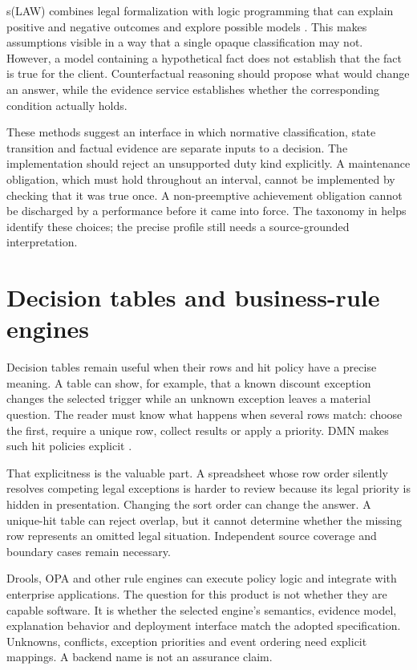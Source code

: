 \documentclass[12pt,a4paper,oneside,openany]{book}
\begin{document}
s(LAW) combines legal formalization with logic programming that can explain
positive and negative outcomes and explore possible models
\citep[secs.~2--5]{slaw2024}. This makes assumptions visible in a way that a
single opaque classification may not. However, a model containing a hypothetical
fact does not establish that the fact is true for the client. Counterfactual
reasoning should propose what would change an answer, while the evidence
service establishes whether the corresponding condition actually holds.

These methods suggest an interface in which normative classification,
state transition and factual evidence are separate inputs to a decision. The
implementation should reject an unsupported duty kind explicitly. A maintenance
obligation, which must hold throughout an interval, cannot be implemented by
checking that it was true once. A non-preemptive achievement obligation cannot
be discharged by a performance before it came into force. The taxonomy in
\citet[sec.~3]{normative2016} helps identify these choices; the precise profile
still needs a source-grounded interpretation.

\section{Decision tables and business-rule engines}
\label{sec:languages-tables}
Decision tables remain useful when their rows and hit policy have a precise
meaning. A table can show, for example, that a known discount exception changes
the selected trigger while an unknown exception leaves a material question.
The reader must know what happens when several rows match: choose the first,
require a unique row, collect results or apply a priority. DMN makes such hit
policies explicit \citep[sec.~8.2.11]{dmn2024}.

That explicitness is the valuable part. A spreadsheet whose row order silently
resolves competing legal exceptions is harder to review because its legal
priority is hidden in presentation. Changing the sort order can change the
answer. A unique-hit table can reject overlap, but it cannot determine whether
the missing row represents an omitted legal situation. Independent source
coverage and boundary cases remain necessary.

Drools, OPA and other rule engines can execute policy logic and integrate with
enterprise applications. The question for this product is not whether they
are capable software. It is whether the selected engine's semantics, evidence
model, explanation behavior and deployment interface match the adopted
specification. Unknowns, conflicts, exception priorities and event ordering
need explicit mappings. A backend name is not an assurance claim.
\end{document}
